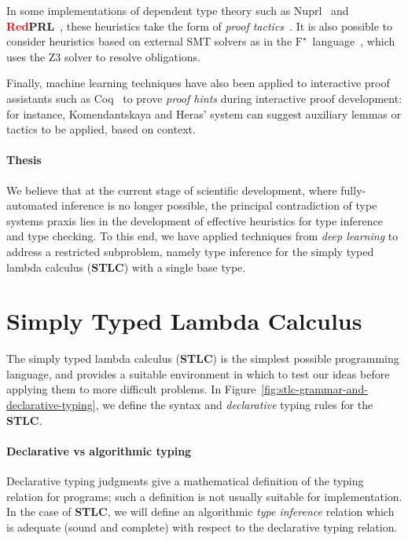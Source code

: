 \documentclass[twocolumn,9pt]{article}
\theoremstyle{definition}
\theoremstyle{remark}
\numberwithin{equation}{section}
\newcommand\STLC{{\sffamily\bfseries{}STLC}}
\newcommand\FStar{\ensuremath{\text{F}^\star}}
\newcommand\RedPRL{\textbf{\textcolor{red}{Red}PRL}}
\begin{document}
In some implementations of dependent type theory such as
Nuprl~\cite{constable:1986} and \RedPRL{}~\cite{redprl:2016}, these
heuristics take the form of \emph{proof
  tactics}~\cite{gordon-milner-wadsworth:1979,paulson:1987,gordon:2000}. It
is also possible to consider heuristics based on external SMT solvers
as in the \FStar{}~language~\cite{ahman-et-al:2017}, which uses the Z3
solver to resolve obligations.

Finally, machine learning techniques have also been applied to
interactive proof assistants such as
Coq~\cite{komendantskaya-heras-grov:2012} to prove \emph{proof hints}
during interactive proof development: for instance, Komendantskaya and
Heras' system can suggest auxiliary lemmas or tactics to be applied,
based on context.

\paragraph{Thesis}
We believe that at the current stage of scientific development, where
fully-automated inference is no longer possible, the principal
contradiction of type systems praxis lies in the development of
effective heuristics for type inference and type checking. To this
end, we have applied techniques from \emph{deep learning} to address a
restricted subproblem, namely type inference for the simply typed
lambda calculus (\STLC{}) with a single base type.

\section{Simply Typed Lambda Calculus}
The simply typed lambda calculus (\STLC{}) is the simplest possible
programming language, and provides a suitable environment in which to
test our ideas before applying them to more difficult problems. In
Figure~\ref{fig:stlc-grammar-and-declarative-typing}, we define the
syntax and \emph{declarative} typing rules for the \STLC{}.

\paragraph{Declarative vs algorithmic typing}
Declarative typing judgments give a mathematical definition of the
typing relation for programs; such a definition is not usually
suitable for implementation. In the case of \STLC{}, we will define an
algorithmic \emph{type inference} relation which is adequate (sound
and complete) with respect to the declarative typing relation.
\end{document}
